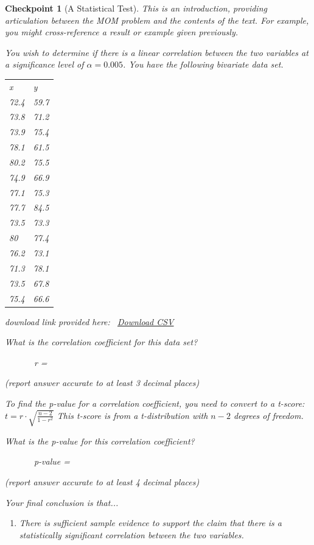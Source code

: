 \documentclass[pdflatex]{sn-jnl}
\theoremstyle{thmstyleone}%
\theoremstyle{thmstyletwo}%
\newtheorem{inlineexercise}[theorem]{Checkpoint}
\theoremstyle{thmstylethree}%
\newcommand{\tabularfont}{\relax}
\numberwithin{equation}{section}
\begin{document}
\begin{inlineexercise}[A Statistical Test]\label{section-myopenmath-4}%
%
This is an introduction, providing articulation between the MOM problem and the contents of the text.  For example, you might cross-reference a result or example given previously.%
\par
You wish to determine if there is a  linear correlation between the two variables at a significance level of \(\displaystyle\alpha={0.005}\). You have the following bivariate data set.%
\begin{center}%
{\tabularfont%
\begin{tabular}{ll}
x&y\tabularnewline[0pt]
72.4&59.7\tabularnewline[0pt]
73.8&71.2\tabularnewline[0pt]
73.9&75.4\tabularnewline[0pt]
78.1&61.5\tabularnewline[0pt]
80.2&75.5\tabularnewline[0pt]
74.9&66.9\tabularnewline[0pt]
77.1&75.3\tabularnewline[0pt]
77.7&84.5\tabularnewline[0pt]
73.5&73.3\tabularnewline[0pt]
80&77.4\tabularnewline[0pt]
76.2&73.1\tabularnewline[0pt]
71.3&78.1\tabularnewline[0pt]
73.5&67.8\tabularnewline[0pt]
75.4&66.6
\end{tabular}
}%
\end{center}%
download link provided here:  \href{denied:data:text/csv;charset=UTF-8,\%22x\%22\%2C\%22y\%22\%0A72.4\%2C59.7\%0A73.8\%2C71.2\%0A73.9\%2C75.4\%0A78.1\%2C61.5\%0A80.2\%2C75.5\%0A74.9\%2C66.9\%0A77.1\%2C75.3\%0A77.7\%2C84.5\%0A73.5\%2C73.3\%0A80\%2C77.4\%0A76.2\%2C73.1\%0A71.3\%2C78.1\%0A73.5\%2C67.8\%0A75.4\%2C66.6}{Download CSV}\footnotemark{}%
\par
What is the correlation coefficient for this data set?%
\par
       \emph{r} = %
\par
(report answer accurate to at least 3 decimal places)%
\par
To find the p-value for a correlation coefficient, you need to convert to a \emph{t}-score: \(\displaystyle{t}={r}\cdot\sqrt{{\frac{{{n}-{2}}}{{{1}-{r}^{{2}}}}}}\) This \emph{t}-score is from a \emph{t}-distribution with \(\displaystyle{n}-{2}\) degrees of freedom.%
\par
What is the p-value for this correlation coefficient?%
\par
       p-value = %
\par
(report answer accurate to at least 4 decimal places)%
\par
Your final conclusion is that...%
\par
%
\begin{enumerate}
\item{}There is sufficient sample evidence to support the claim that there is a statistically significant  correlation between the two variables.%

\end{enumerate}
\end{inlineexercise}
\end{document}
